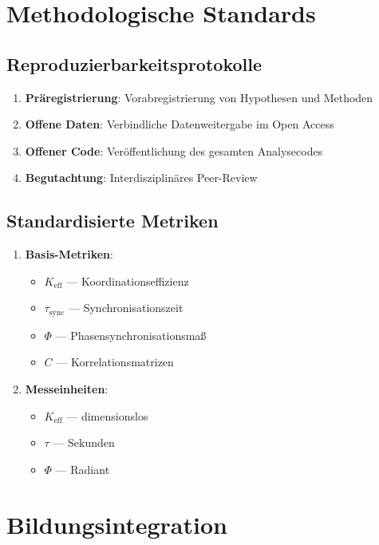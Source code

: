 \documentclass[12pt,a4paper]{article}
\begin{document}
	\section{Methodologische Standards}
	
	\subsection{Reproduzierbarkeitsprotokolle}
	
	\begin{enumerate}
		\item \textbf{Präregistrierung}: Vorabregistrierung von Hypothesen und Methoden
		\item \textbf{Offene Daten}: Verbindliche Datenweitergabe im Open Access
		\item \textbf{Offener Code}: Veröffentlichung des gesamten Analysecodes
		\item \textbf{Begutachtung}: Interdisziplinäres Peer-Review
	\end{enumerate}
	
	\subsection{Standardisierte Metriken}
	
	\begin{enumerate}
		\item \textbf{Basis-Metriken}:
		\begin{itemize}
			\item $K_{\mathrm{eff}}$ — Koordinationseffizienz
			\item $\tau_{\mathrm{sync}}$ — Synchronisationszeit
			\item $\Phi$ — Phasensynchronisationsmaß
			\item $C$ — Korrelationsmatrizen
		\end{itemize}
		
		\item \textbf{Messeinheiten}:
		\begin{itemize}
			\item $K_{\mathrm{eff}}$ — dimensionslos
			\item $\tau$ — Sekunden
			\item $\Phi$ — Radiant
		\end{itemize}
	\end{enumerate}
	
	\section{Bildungsintegration}
	
\end{document}

